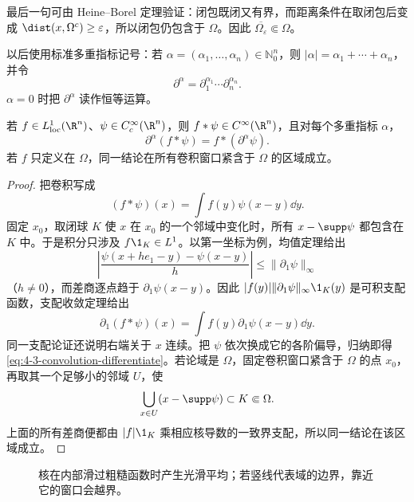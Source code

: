 最后一句可由 Heine--Borel 定理验证：闭包既闭又有界，而距离条件在取闭包后变成
$\dist(x,\Omega^c)\geq\varepsilon$，所以闭包仍包含于 $\Omega$。因此
$\overline{\Omega_\varepsilon}\Subset\Omega$。

以后使用标准多重指标记号：若
$\alpha=(\alpha_1,\ldots,\alpha_n)\in\mathbb N_0^n$，则
$|\alpha|=\alpha_1+\cdots+\alpha_n$，并令
\[
 \partial^\alpha
 =\partial_1^{\alpha_1}\cdots\partial_n^{\alpha_n}.
\]
$\alpha=0$ 时把 $\partial^\alpha$ 读作恒等运算。

\begin{proposition}[卷积光滑性]\label{proposition:4-3-1-1}
若 $f\in L^1_{\mathrm{loc}}(\R^n)$、$\psi\in C_c^\infty(\R^n)$，则
$f*\psi\in C^\infty(\R^n)$，且对每个多重指标 $\alpha$，
\[
 \partial^\alpha(f*\psi)=f*(\partial^\alpha\psi).
 \tag{4.3.1}\label{eq:4-3-convolution-differentiate}
\]
若 $f$ 只定义在 $\Omega$，同一结论在所有卷积窗口紧含于 $\Omega$ 的区域成立。
\end{proposition}

\begin{proof}
把卷积写成
\[
 (f*\psi)(x)=\int f(y)\psi(x-y)\dd y.
\]
固定 $x_0$，取闭球 $K$ 使 $x$ 在 $x_0$ 的一个邻域中变化时，所有
$x-\supp\psi$ 都包含在 $K$ 中。于是积分只涉及 $f\1_K\in L^1$。以第一坐标为例，均值定理给出
\[
 \left|\frac{\psi(x+he_1-y)-\psi(x-y)}h\right|
 \leq\|\partial_1\psi\|_\infty
\]
（$h\ne0$），而差商逐点趋于 $\partial_1\psi(x-y)$。因此
$|f(y)|\|\partial_1\psi\|_\infty\1_K(y)$ 是可积支配函数，支配收敛定理给出
\[
 \partial_1(f*\psi)(x)=\int f(y)\partial_1\psi(x-y)\dd y.
\]
同一支配论证还说明右端关于 $x$ 连续。把 $\psi$ 依次换成它的各阶偏导，归纳即得
\eqref{eq:4-3-convolution-differentiate}。若论域是 $\Omega$，固定卷积窗口紧含于 $\Omega$ 的点
$x_0$，再取其一个足够小的邻域 $U$，使
\[
 \bigcup_{x\in U}(x-\supp\psi)\subset K\Subset\Omega.
\]
上面的所有差商便都由 $|f|\1_K$ 乘相应核导数的一致界支配，所以同一结论在该区域成立。
\end{proof}

\begin{figure}[htbp]
  \centering
  \caption{核在内部滑过粗糙函数时产生光滑平均；若竖线代表域的边界，靠近它的窗口会越界。}
  \label{fig:4-3-1-mollifier-window}
\end{figure}

